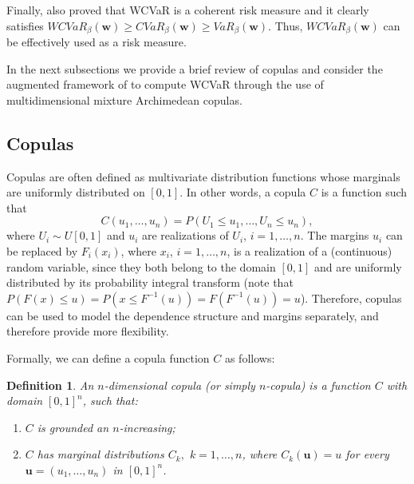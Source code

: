 \documentclass[a4paper,10pt]{article}
\newtheorem{mydef}{Definition}
\begin{document}
Finally, \citet*{zhu2009worst} also proved that WCVaR is a coherent risk measure and it clearly satisfies $WCVaR_{\beta }\left( \mathbf{w}\right) \geq CVaR_{\beta }\left( \mathbf{w}\right) \geq VaR_{\beta }\left( \mathbf{w} \right) $. Thus, $WCVaR_{\beta }\left( \mathbf{w}\right) $ can be effectively used as a risk measure.

In the next subsections we provide a brief review of copulas and consider the augmented framework of \citet*{kakouris14} to compute WCVaR through the use of multidimensional mixture Archimedean copulas.

\subsection{Copulas}

 Copulas are often defined as multivariate distribution functions whose marginals are uniformly distributed on $[0,1]$. In other words, a copula $C$ is a function such that
\begin{equation}
C\left( u_{1},\ldots,u_{n}\right) =P\left( U_{1}\leq u_{1},\ldots,U_{n}\leq
u_{n}\right),\label{20}
\end{equation}
where $U_{i}\sim U[0,1]$ and $u_{i}$ are realizations of $U_{i}$, $i=1,\ldots,n$. The margins $u_{i}$ can be replaced by $F_{i}\left( x_{i}\right) $, where $x_{i}$, $i=1,\ldots,n$, is a realization of a (continuous) random variable, since they both belong to the domain $[0,1]$ and are uniformly distributed by its probability integral transform (note that $P\left( F\left( x\right) \leq u\right) =P\left( x\leq F^{-1}\left( u\right) \right) =F\left(F^{-1}\left( u\right) \right) =u$). Therefore, copulas can be used to model the dependence structure and margins separately, and therefore provide more flexibility.

Formally, we can define a copula function $C$ as follows:
\begin{mydef}
	An $n$-dimensional copula (or simply $n$-copula) is a function $C$ with domain $[0,1]^{n}$, such that:
	\begin{enumerate}[1.]
		\item $C$ is grounded an $n$-increasing;
		\item $C$ has marginal distributions $C_{k},$ $k=1,\ldots,n$, where $C_{k}(\mathbf{u})=u$ for every $\mathbf{u}=\left( u_{1},\ldots,u_{n}\right) $ in $[0,1]^{n}$.
	\end{enumerate}
\end{mydef}
\end{document}
